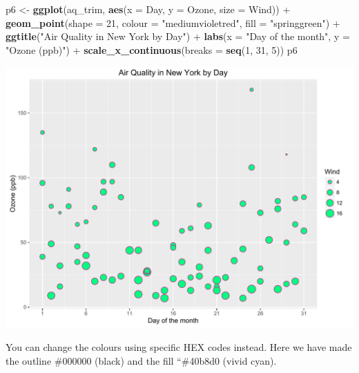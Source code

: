 \documentclass[]{article}
\newenvironment{Shaded}{\begin{snugshade}}{\end{snugshade}}
\newcommand{\KeywordTok}[1]{\textcolor[rgb]{0.13,0.29,0.53}{\textbf{{#1}}}}
\newcommand{\DataTypeTok}[1]{\textcolor[rgb]{0.13,0.29,0.53}{{#1}}}
\newcommand{\DecValTok}[1]{\textcolor[rgb]{0.00,0.00,0.81}{{#1}}}
\newcommand{\StringTok}[1]{\textcolor[rgb]{0.31,0.60,0.02}{{#1}}}
\newcommand{\NormalTok}[1]{{#1}}
\begin{document}
\begin{Shaded}
\begin{Highlighting}[]
\NormalTok{p6 <-}\StringTok{ }\KeywordTok{ggplot}\NormalTok{(aq_trim, }\KeywordTok{aes}\NormalTok{(}\DataTypeTok{x =} \NormalTok{Day, }\DataTypeTok{y =} \NormalTok{Ozone, }\DataTypeTok{size =} \NormalTok{Wind)) +}\StringTok{ }
\StringTok{      }\KeywordTok{geom_point}\NormalTok{(}\DataTypeTok{shape =} \DecValTok{21}\NormalTok{, }\DataTypeTok{colour =} \StringTok{"mediumvioletred"}\NormalTok{, }
       \DataTypeTok{fill =} \StringTok{"springgreen"}\NormalTok{) +}
\StringTok{      }\KeywordTok{ggtitle}\NormalTok{(}\StringTok{"Air Quality in New York by Day"}\NormalTok{) +}\StringTok{ }
\StringTok{      }\KeywordTok{labs}\NormalTok{(}\DataTypeTok{x =} \StringTok{"Day of the month"}\NormalTok{, }\DataTypeTok{y =} \StringTok{"Ozone (ppb)"}\NormalTok{) +}
\StringTok{      }\KeywordTok{scale_x_continuous}\NormalTok{(}\DataTypeTok{breaks =} \KeywordTok{seq}\NormalTok{(}\DecValTok{1}\NormalTok{, }\DecValTok{31}\NormalTok{, }\DecValTok{5}\NormalTok{)) }
\NormalTok{p6}
\end{Highlighting}
\end{Shaded}

\begin{center}\includegraphics{0_all_posts_pdf/wscatter_6-1} \end{center}

You can change the colours using specific HEX codes instead. Here we
have made the outline \#000000 (black) and the fill ``\#40b8d0 (vivid
cyan).
\end{document}
